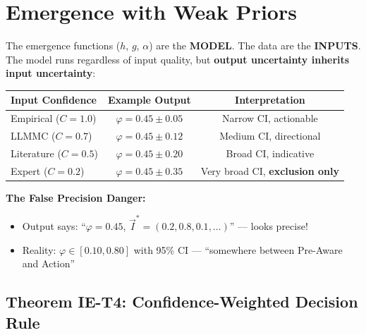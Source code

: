 \section{Emergence with Weak Priors}
\label{sec:ie-weak-priors}

\begin{tcolorbox}[colback=red!5!white, colframe=red!75!black,
    title=\textbf{Critical Question: What Happens When We Emerge from Expert Estimates Only?}]

The emergence functions ($h$, $g$, $\alpha$) are the \textbf{MODEL}. The data are the \textbf{INPUTS}. The model runs regardless of input quality, but \textbf{output uncertainty inherits input uncertainty}:

\begin{center}
\renewcommand{\arraystretch}{1.3}
\begin{tabular}{@{}lcc@{}}
\toprule
\textbf{Input Confidence} & \textbf{Example Output} & \textbf{Interpretation} \\
\midrule
Empirical ($C = 1.0$) & $\varphi = 0.45 \pm 0.05$ & Narrow CI, actionable \\
LLMMC ($C = 0.7$) & $\varphi = 0.45 \pm 0.12$ & Medium CI, directional \\
Literature ($C = 0.5$) & $\varphi = 0.45 \pm 0.20$ & Broad CI, indicative \\
Expert ($C = 0.2$) & $\varphi = 0.45 \pm 0.35$ & Very broad CI, \textbf{exclusion only} \\
\bottomrule
\end{tabular}
\end{center}

\textbf{The False Precision Danger:}
\begin{itemize}[nosep]
    \item Output says: ``$\varphi = 0.45$, $\vec{I}^* = (0.2, 0.8, 0.1, \ldots)$'' --- looks precise!
    \item Reality: $\varphi \in [0.10, 0.80]$ with 95\% CI --- ``somewhere between Pre-Aware and Action''
\end{itemize}
\end{tcolorbox}

\subsection{Theorem IE-T4: Confidence-Weighted Decision Rule}

